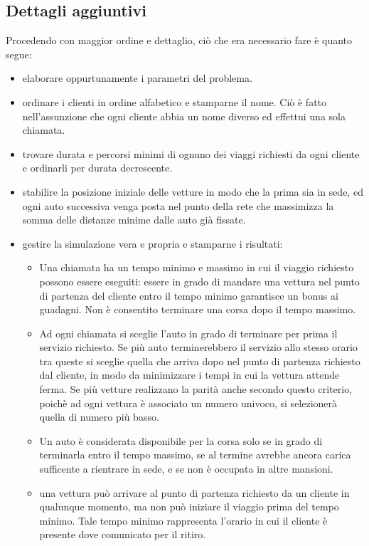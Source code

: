 \documentclass[a4paper,11pt]{Article}
\begin{document}
\subsection{Dettagli aggiuntivi}
Procedendo con maggior ordine e dettaglio, ciò che era necessario fare è quanto segue:
\begin{itemize}
\item elaborare oppurtunamente i parametri del problema.
\item ordinare i clienti in ordine alfabetico e stamparne il nome. Ciò è fatto nell'assunzione che ogni cliente abbia un nome diverso ed effettui una sola chiamata.
\item trovare durata e percorsi minimi di ognuno dei viaggi richiesti da ogni cliente e ordinarli per durata decrescente.
\item stabilire la posizione iniziale delle vetture in modo che la prima sia in sede, ed ogni auto successiva venga posta nel punto della rete che massimizza la somma delle distanze minime dalle auto già fissate.
\item gestire la simulazione vera e propria e stamparne i risultati:
  \begin{itemize}
    \item Una chiamata ha un tempo minimo e massimo in cui il viaggio richiesto possono essere eseguiti: essere in grado di mandare una vettura nel punto di partenza del cliente entro il tempo minimo garantisce un bonus ai guadagni. Non è consentito terminare una corsa dopo il tempo massimo.
    \item Ad ogni chiamata si sceglie l'auto in grado di terminare per prima il servizio richiesto. Se più auto terminerebbero il servizio allo stesso orario tra queste si sceglie quella che arriva dopo nel punto di partenza richiesto dal cliente, in modo da minimizzare i tempi in cui la vettura attende ferma. Se più vetture realizzano la parità anche secondo questo criterio, poichè ad ogni vettura è associato un numero univoco, si selezionerà quella di numero più basso.
    \item Un auto è considerata disponibile per la corsa solo se in grado di terminarla entro il tempo massimo, se al termine avrebbe ancora carica sufficente a rientrare in sede, e se non è occupata in altre mansioni.
    \item una vettura può arrivare al punto di partenza richiesto da un cliente in qualunque momento, ma non può iniziare il viaggio prima del tempo minimo. Tale tempo minimo rappresenta l'orario in cui il cliente è presente dove comunicato per il ritiro.

\end{itemize}
\end{itemize}
\end{document}
